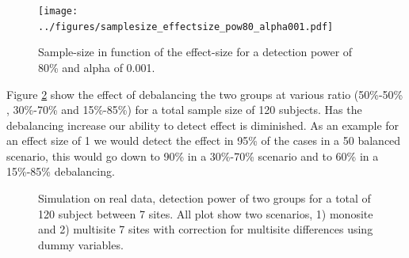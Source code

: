 \documentclass[authoryear]{elsarticle}
\begin{document}
\begin{figure}[tbp]
\centering
\texttt{[image: ../figures/samplesize\_effectsize\_pow80\_alpha001.pdf]}
\caption[]{
Sample-size in function of the effect-size for a detection power of 80\% and alpha of 0.001.
}
\label{fig_sampeffect_curves_alpha001}
\end{figure}


Figure \ref{fig_real_sim_debalancing} show the effect of debalancing the two groups at various ratio (50\%-50\% , 30\%-70\% and 15\%-85\%) for a total sample size of 120 subjects. Has the debalancing increase our ability to detect effect is diminished. As an example for an effect size of 1 we would detect the effect in 95\% of the cases in a 50 balanced scenario, this would go down to 90\% in a 30\%-70\% scenario and to 60\% in a 15\%-85\% debalancing. 


\begin{figure}[tbp]
\centering
\captionsetup[subfloat]{labelformat=empty}
\hspace{1mm}
\hspace{1mm}
\hspace{1mm}
\caption{
Simulation on real data, detection power of two groups for a total of 120 subject between 7 sites. All plot show two scenarios, 1) monosite and 2) multisite 7 sites with correction for multisite differences using dummy variables.
}
\label{fig_real_sim_debalancing}
\end{figure}
\end{document}
